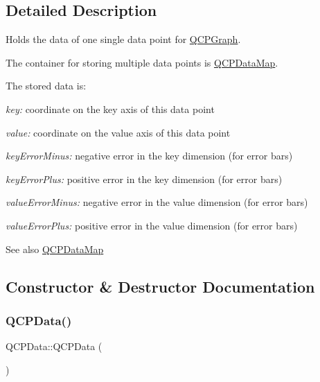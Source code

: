 \subsection{Detailed Description}
Holds the data of one single data point for \hyperlink{class_q_c_p_graph}{Q\+C\+P\+Graph}. 

The container for storing multiple data points is \hyperlink{qcustomplot_8h_a84a9c4a4c2216ccfdcb5f3067cda76e3}{Q\+C\+P\+Data\+Map}.

The stored data is\+: \begin{DoxyItemize}
\item {\itshape key\+:} coordinate on the key axis of this data point \item {\itshape value\+:} coordinate on the value axis of this data point \item {\itshape key\+Error\+Minus\+:} negative error in the key dimension (for error bars) \item {\itshape key\+Error\+Plus\+:} positive error in the key dimension (for error bars) \item {\itshape value\+Error\+Minus\+:} negative error in the value dimension (for error bars) \item {\itshape value\+Error\+Plus\+:} positive error in the value dimension (for error bars)\end{DoxyItemize}
\begin{DoxySeeAlso}{See also}
\hyperlink{qcustomplot_8h_a84a9c4a4c2216ccfdcb5f3067cda76e3}{Q\+C\+P\+Data\+Map} 
\end{DoxySeeAlso}


\subsection{Constructor \& Destructor Documentation}
\hypertarget{class_q_c_p_data_a1f06d624e36ba0ed72ac36d42aa5c7ee}{}\label{class_q_c_p_data_a1f06d624e36ba0ed72ac36d42aa5c7ee} 
\subsubsection{\texorpdfstring{Q\+C\+P\+Data()}{QCPData()}\hspace{0.1cm}{\footnotesize\ttfamily [1/2]}}
{\footnotesize\ttfamily Q\+C\+P\+Data\+::\+Q\+C\+P\+Data (\begin{DoxyParamCaption}{ }\end{DoxyParamCaption})}

